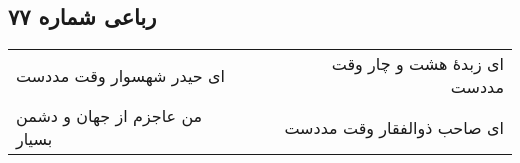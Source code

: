 \begin{center}
\section*{رباعی شماره ۷۷}
\label{sec:sh077}
\begin{longtable}{l p{0.5cm} r}
ای حیدر شهسوار وقت مددست
&&
ای زبدهٔ هشت و چار وقت مددست
\\
من عاجزم از جهان و دشمن بسیار
&&
ای صاحب ذوالفقار وقت مددست
\\
\end{longtable}
\end{center}
